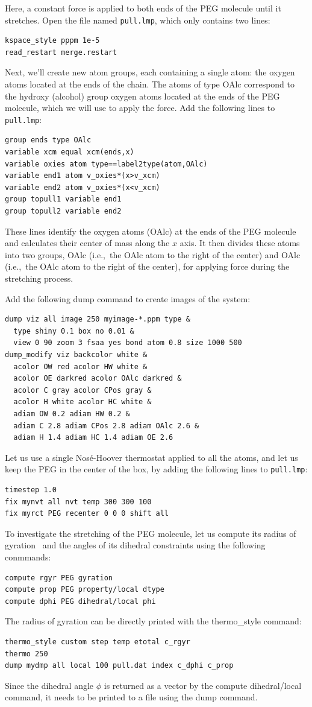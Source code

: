 \documentclass[9pt,tutorial]{livecoms}
\newcommand{\lmpcmd}[1]{\hspace{0pt}\colorbox{listing}{\textcolor{command}{\small{#1}}}\hspace{0pt}} %
\newcommand{\flecmd}[1]{\textcolor{command}{\texttt{#1}}} %
\begin{document}
Here, a constant force is applied to both ends of the PEG molecule until it
stretches.  Open the file named \flecmd{pull.lmp}, which
only contains two lines:
\begin{lstlisting}
kspace_style pppm 1e-5
read_restart merge.restart
\end{lstlisting}
Next, we'll create new atom groups, each containing a single atom: the oxygen
atoms located at the ends of the chain.  The atoms of type \lmpcmd{OAlc}
correspond to the hydroxy (alcohol) group oxygen atoms located at the ends
of the PEG molecule, which we will use to apply the force.  Add the
following lines to \flecmd{pull.lmp}:
\begin{lstlisting}
group ends type OAlc
variable xcm equal xcm(ends,x)
variable oxies atom type==label2type(atom,OAlc)
variable end1 atom v_oxies*(x>v_xcm)
variable end2 atom v_oxies*(x<v_xcm)
group topull1 variable end1
group topull2 variable end2
\end{lstlisting}
These lines identify the oxygen atoms (\lmpcmd{OAlc}) at the ends of the PEG
molecule and calculates their center of mass along the $x$ axis.  It then
divides these atoms into two groups, \lmpcmd{OAlc} (i.e.,~the OAlc atom to
the right of the center) and \lmpcmd{OAlc} (i.e.,~the OAlc atom to the right
of the center), for applying force during the stretching process.

Add the following \lmpcmd{dump} command to create images of the system:
\begin{lstlisting}
dump viz all image 250 myimage-*.ppm type &
  type shiny 0.1 box no 0.01 &
  view 0 90 zoom 3 fsaa yes bond atom 0.8 size 1000 500
dump_modify viz backcolor white &
  acolor OW red acolor HW white &
  acolor OE darkred acolor OAlc darkred &
  acolor C gray acolor CPos gray &
  acolor H white acolor HC white &
  adiam OW 0.2 adiam HW 0.2 &
  adiam C 2.8 adiam CPos 2.8 adiam OAlc 2.6 &
  adiam H 1.4 adiam HC 1.4 adiam OE 2.6
\end{lstlisting}
Let us use a single Nosé-Hoover thermostat applied to all the atoms,
and let us keep the PEG in the center of the box, by adding
the following lines to \flecmd{pull.lmp}:
\begin{lstlisting}
timestep 1.0
fix mynvt all nvt temp 300 300 100
fix myrct PEG recenter 0 0 0 shift all
\end{lstlisting}

To investigate the stretching of the PEG molecule, let us compute its radius of
gyration~\cite{fixmanRadiusGyrationPolymer1962a} and the angles of its dihedral
constraints using the following conmmands:
\begin{lstlisting}
compute rgyr PEG gyration
compute prop PEG property/local dtype
compute dphi PEG dihedral/local phi
\end{lstlisting}
The radius of gyration can be directly printed with the \lmpcmd{thermo\_style} command:
\begin{lstlisting}
thermo_style custom step temp etotal c_rgyr
thermo 250
dump mydmp all local 100 pull.dat index c_dphi c_prop
\end{lstlisting}
Since the dihedral angle $\phi$ is returned as a vector by the compute
\lmpcmd{dihedral/local} command, it needs to be printed to a file using
the \lmpcmd{dump} command.
\end{document}
